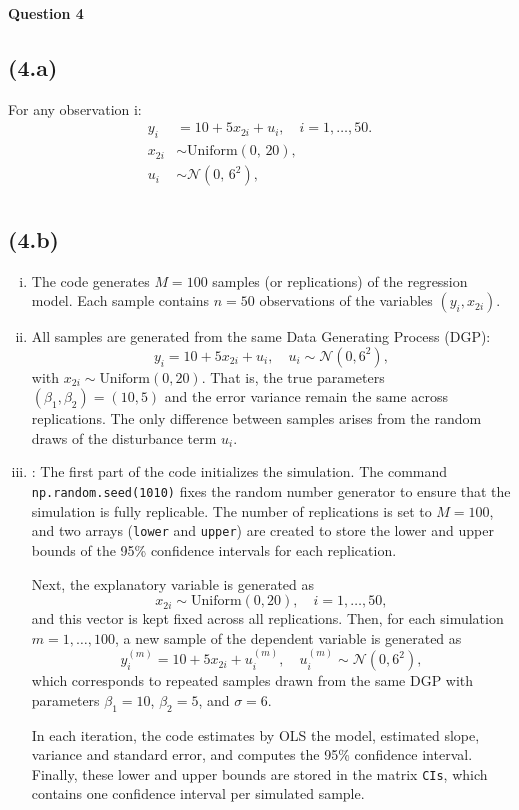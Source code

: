 \documentclass{article}
\begin{document}
\textbf{Question 4 } 
\subsection*{(4.a) }

For any observation i:
\[
\begin{aligned}
y_i &= 10 + 5x_{2i} + u_i, \quad i = 1, \dots, 50. \\[6pt]
x_{2i} &\sim \text{Uniform}(0,\,20), \\[6pt]
u_i &\sim \mathcal{N}(0,\,6^2), \\[6pt]
\end{aligned}
\]

\subsection*{(4.b)}

\begin{enumerate}[(i)]

\item
The code generates \( M = 100 \) samples (or replications) of the regression model. 
Each sample contains \( n = 50 \) observations of the variables \( (y_i, x_{2i}) \).

\item All samples are generated from the same Data Generating Process (DGP):
\[
y_i = 10 + 5x_{2i} + u_i, \quad u_i \sim \mathcal{N}(0,6^2),
\]
with \(x_{2i} \sim \text{Uniform}(0,20)\).
That is, the true parameters \((\beta_1,\beta_2) = (10,5)\) and the error variance 
remain the same across replications. The only difference between samples arises 
from the random draws of the disturbance term \(u_i\).


\item:
The first part of the code initializes the simulation. 
The command \texttt{np.random.seed(1010)} fixes the random number generator to 
ensure that the simulation is fully replicable. The number of replications is set to 
\(M = 100\), and two arrays (\texttt{lower} and \texttt{upper}) are created to store the lower and 
upper bounds of the 95\% confidence intervals for each replication. 

Next, the explanatory variable is generated as 
\[
x_{2i} \sim \text{Uniform}(0,20), \quad i = 1, \dots, 50,
\]
and this vector is kept fixed across all replications. 
Then, for each simulation \(m = 1, \dots, 100\), a new sample of the dependent variable is generated as
\[
y_i^{(m)} = 10 + 5x_{2i} + u_i^{(m)}, \quad u_i^{(m)} \sim \mathcal{N}(0,6^2),
\]
which corresponds to repeated samples drawn from the same DGP with parameters 
\(\beta_1 = 10\), \(\beta_2 = 5\), and \(\sigma = 6\).

In each iteration, the code estimates by OLS the model, estimated slope, variance and standard error, and computes the 95\% 
confidence interval. Finally, these lower and upper bounds are stored in the matrix 
\texttt{CIs}, which contains one confidence interval per simulated sample.

\end{enumerate}
\end{document}
